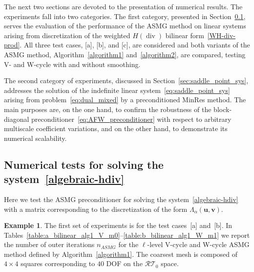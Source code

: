 \documentclass[11pt]{amsart}
\numberwithin{equation}{section}
\theoremstyle{definition}\newtheorem{example}{Example}[section]
\begin{document}
The next two sections are devoted to the presentation of numerical results.
The experiments fall into two categories.
The first category, presented in Section~\ref{sec:Hdiv}, serves the evaluation of the
performance of the ASMG method on linear systems arising from discretization of the
weighted $H({\operatorname{div}})$ bilinear form~\eqref{WH-div-prod}. All three test cases, [a], [b],
and [c], are considered and both variants of the ASMG method, Algorithm~\ref{algorithm1}
and~\ref{algorithm2}, are compared, testing V- and W-cycle with and without smoothing.

The second category of experiments, discussed in Section~\ref{sec:saddle_point_sys},
addresses the solution of the indefinite linear system~\eqref{eq:saddle_point_sys}
arising from problem~\eqref{eq:dual_mixed} by a preconditioned MinRes method.
The main purposes are, on the one hand, to confirm the robustness of the block-diagonal
preconditioner~\eqref{eq:AFW_preconditioner} with respect to arbitrary multiscale
coefficient variations, and on the other hand, to demonstrate its numerical scalability.

\subsection{Numerical tests for solving the system~\eqref{algebraic-hdiv}}\label{sec:Hdiv}
Here we test the ASMG preconditioner for solving the system~\eqref{algebraic-hdiv} with
a matrix corresponding 
to the discretization
of the form $\Lambda_\alpha({{\mathbf u}},{{\mathbf v}})$. 
\begin{example} \label{ex:1} 
The first set of experiments is for the test cases~[a] and~[b].
In Tables~\ref{table:a_bilinear_alg1_V_m0}--\ref{table:b_bilinear_alg1_W_m1} we report the 
number of outer iterations $n_{ASMG}$ for the $\ell$-level V-cycle and W-cycle ASMG method
defined by
Algorithm~\ref{algorithm1}.
The coarsest mesh is composed of $4\times 4$ squares corresponding to $40$ DOF 
on the ${{\mathcal{RT}}_{{0}}}$ space. 
\end{example}
\end{document}
